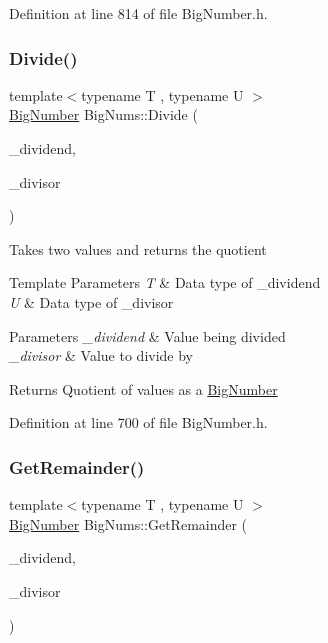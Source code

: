 Definition at line 814 of file Big\+Number.\+h.

\mbox{\label{namespace_big_nums_a5509ae7c6fe5bd643f0b70813af082e4}} 
\subsubsection{\texorpdfstring{Divide()}{Divide()}}
{\footnotesize\ttfamily template$<$typename T , typename U $>$ \\
\mbox{\hyperlink{class_big_nums_1_1_big_number}{Big\+Number}} Big\+Nums\+::\+Divide (\begin{DoxyParamCaption}\item[{const T \&}]{\+\_\+dividend,  }\item[{const U \&}]{\+\_\+divisor }\end{DoxyParamCaption})}

Takes two values and returns the quotient 
\begin{DoxyTemplParams}{Template Parameters}
{\em T} & Data type of \+\_\+dividend \\
\hline
{\em U} & Data type of \+\_\+divisor \\
\hline
\end{DoxyTemplParams}

\begin{DoxyParams}{Parameters}
{\em \+\_\+dividend} & Value being divided \\
\hline
{\em \+\_\+divisor} & Value to divide by \\
\hline
\end{DoxyParams}
\begin{DoxyReturn}{Returns}
Quotient of values as a \mbox{\hyperlink{class_big_nums_1_1_big_number}{Big\+Number}} 
\end{DoxyReturn}


Definition at line 700 of file Big\+Number.\+h.

\mbox{\label{namespace_big_nums_a61b932319b89265b00a55e8dcce77b0e}} 
\subsubsection{\texorpdfstring{GetRemainder()}{GetRemainder()}}
{\footnotesize\ttfamily template$<$typename T , typename U $>$ \\
\mbox{\hyperlink{class_big_nums_1_1_big_number}{Big\+Number}} Big\+Nums\+::\+Get\+Remainder (\begin{DoxyParamCaption}\item[{const T \&}]{\+\_\+dividend,  }\item[{const U \&}]{\+\_\+divisor }\end{DoxyParamCaption})}

